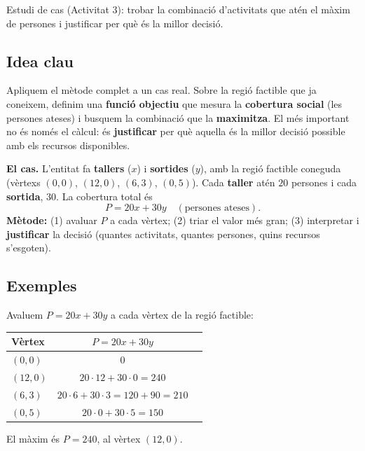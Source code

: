%
{Estudi de cas (Activitat 3): trobar la combinació d'activitats que atén el màxim de persones i justificar per què és la millor decisió.}

\subsection{Idea clau}

Apliquem el mètode complet a un cas real. Sobre la regió factible que ja coneixem,
definim una \textbf{funció objectiu} que mesura la \textbf{cobertura social} (les
persones ateses) i busquem la combinació que la \textbf{maximitza}. El més important
no és només el càlcul: és \textbf{justificar} per què aquella és la millor decisió
possible amb els recursos disponibles.

\begin{idea}
\textbf{El cas.} L'entitat fa \textbf{tallers} ($x$) i \textbf{sortides} ($y$), amb la
regió factible coneguda (vèrtexs $(0,0)$, $(12,0)$, $(6,3)$, $(0,5)$). Cada
\textbf{taller} atén $20$ persones i cada \textbf{sortida}, $30$. La cobertura total és
\[
P=20x+30y \quad(\text{persones ateses}).
\]
\textbf{Mètode:} (1) avaluar $P$ a cada vèrtex; (2) triar el valor més gran; (3)
interpretar i \textbf{justificar} la decisió (quantes activitats, quantes persones,
quins recursos s'esgoten).
\end{idea}

\subsection{Exemples}

\begin{exemple}
Avaluem $P=20x+30y$ a cada vèrtex de la regió factible:
\begin{center}
\begin{tabular}{lcl}
\toprule
\textbf{Vèrtex} & $P=20x+30y$ & \\
\midrule
$(0,0)$ & $0$ & \\
$(12,0)$ & $20\cdot 12+30\cdot 0=240$ & \\
$(6,3)$ & $20\cdot 6+30\cdot 3=120+90=210$ & \\
$(0,5)$ & $20\cdot 0+30\cdot 5=150$ & \\
\bottomrule
\end{tabular}
\end{center}
El màxim és $P=240$, al vèrtex $(12,0)$.
\end{exemple}

